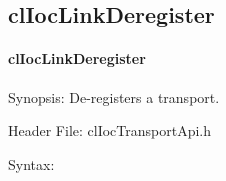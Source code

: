 \begin{flushleft}
\subsection{clIocLinkDeregister}
\hypertarget{pageioc304}{}\paragraph{cl\-Ioc\-Link\-Deregister}\label{pageioc304}
\begin{Desc}
\item[Synopsis:]De-registers a transport.\end{Desc}
\begin{Desc}
\item[Header File:]clIocTransportApi.h\end{Desc}
\begin{Desc}
\item[Syntax:]


\end{Desc}
\end{flushleft}
